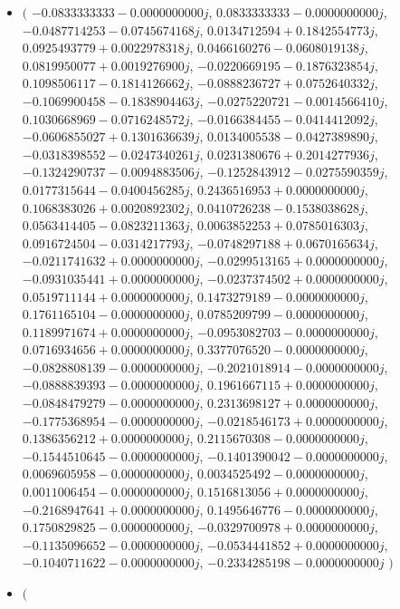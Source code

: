 \documentclass[14pt,a4paper]{article}
\begin{document}
\begin{itemize}
\item
$\big($
$-0.0833333333-0.0000000000j$, $0.0833333333-0.0000000000j$, $-0.0487714253-0.0745674168j$, $0.0134712594+0.1842554773j$, $0.0925493779+0.0022978318j$, $0.0466160276-0.0608019138j$, $0.0819950077+0.0019276900j$, $-0.0220669195-0.1876323854j$, $0.1098506117-0.1814126662j$, $-0.0888236727+0.0752640332j$, $-0.1069900458-0.1838904463j$, $-0.0275220721-0.0014566410j$, $0.1030668969-0.0716248572j$, $-0.0166384455-0.0414412092j$, $-0.0606855027+0.1301636639j$, $0.0134005538-0.0427389890j$, $-0.0318398552-0.0247340261j$, $0.0231380676+0.2014277936j$, $-0.1324290737-0.0094883506j$, $-0.1252843912-0.0275590359j$, $0.0177315644-0.0400456285j$, $0.2436516953+0.0000000000j$, $0.1068383026+0.0020892302j$, $0.0410726238-0.1538038628j$, $0.0563414405-0.0823211363j$, $0.0063852253+0.0785016303j$, $0.0916724504-0.0314217793j$, $-0.0748297188+0.0670165634j$, $-0.0211741632+0.0000000000j$, $-0.0299513165+0.0000000000j$, $-0.0931035441+0.0000000000j$, $-0.0237374502+0.0000000000j$, $0.0519711144+0.0000000000j$, $0.1473279189-0.0000000000j$, $0.1761165104-0.0000000000j$, $0.0785209799-0.0000000000j$, $0.1189971674+0.0000000000j$, $-0.0953082703-0.0000000000j$, $0.0716934656+0.0000000000j$, $0.3377076520-0.0000000000j$, $-0.0828808139-0.0000000000j$, $-0.2021018914-0.0000000000j$, $-0.0888839393-0.0000000000j$, $0.1961667115+0.0000000000j$, $-0.0848479279-0.0000000000j$, $0.2313698127+0.0000000000j$, $-0.1775368954-0.0000000000j$, $-0.0218546173+0.0000000000j$, $0.1386356212+0.0000000000j$, $0.2115670308-0.0000000000j$, $-0.1544510645-0.0000000000j$, $-0.1401390042-0.0000000000j$, $0.0069605958-0.0000000000j$, $0.0034525492-0.0000000000j$, $0.0011006454-0.0000000000j$, $0.1516813056+0.0000000000j$, $-0.2168947641+0.0000000000j$, $0.1495646776-0.0000000000j$, $0.1750829825-0.0000000000j$, $-0.0329700978+0.0000000000j$, $-0.1135096652-0.0000000000j$, $-0.0534441852+0.0000000000j$, $-0.1040711622-0.0000000000j$, $-0.2334285198-0.0000000000j$
$\big)$
\item
$\big($

\end{itemize}
\end{document}

